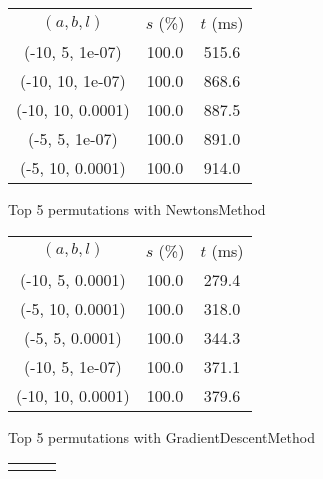 \begin{figure}[H]
\label{fig:param_comp_MatrixSquareSum_GoldenSectionSearch}
\begin{subfigure}[ht]{.5\textwidth}
\begin{tabular}{|c|c|c|}
\hline
\rowcolor{gray!25}
\multicolumn{3}{|c|}{NewtonsMethod} \\
\hline
\rowcolor{gray!25}
$(a,b,l)$ & $s$ (\%) & $t$ (ms) \\
\hline
(-10, 5, 1e-07) & 100.0 & 515.6 \\
(-10, 10, 1e-07) & 100.0 & 868.6 \\
(-10, 10, 0.0001) & 100.0 & 887.5 \\
(-5, 5, 1e-07) & 100.0 & 891.0 \\
(-5, 10, 0.0001) & 100.0 & 914.0 \\
\hline
\end{tabular}
\caption{Top 5 permutations with NewtonsMethod}
\label{subfig:param_comp_MatrixSquareSum_NewtonsMethod_GoldenSectionSearch}
\end{subfigure}
\hfill
\begin{subfigure}[ht]{.5\textwidth}
\begin{tabular}{|c|c|c|}
\hline
\rowcolor{gray!25}
\multicolumn{3}{|c|}{GradientDescentMethod} \\
\hline
\rowcolor{gray!25}
$(a,b,l)$ & $s$ (\%) & $t$ (ms) \\
\hline
(-10, 5, 0.0001) & 100.0 & 279.4 \\
(-5, 10, 0.0001) & 100.0 & 318.0 \\
(-5, 5, 0.0001) & 100.0 & 344.3 \\
(-10, 5, 1e-07) & 100.0 & 371.1 \\
(-10, 10, 0.0001) & 100.0 & 379.6 \\
\hline
\end{tabular}
\caption{Top 5 permutations with GradientDescentMethod}
\label{subfig:param_comp_MatrixSquareSum_GradientDescentMethod_GoldenSectionSearch}
\end{subfigure}
\hfill
\begin{subfigure}[ht]{.5\textwidth}
\begin{tabular}{|c|c|c|}
\hline
\rowcolor{gray!25}
\multicolumn{3}{|c|}{ConjugateGradientMethod} \\

\end{tabular}
\end{subfigure}
\end{figure}
